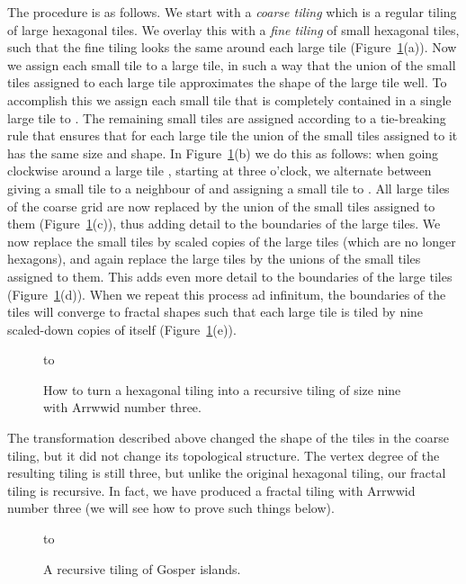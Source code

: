 \documentclass[11pt,a4paper]{article}
\begin{document}
The procedure is as follows. We start with a \emph{coarse tiling} which is a regular tiling of large hexagonal tiles. We overlay this with a \emph{fine tiling} of small hexagonal tiles, such that the fine tiling looks the same around each large tile (Figure~\ref{fig:recursification}(a)). Now we assign each small tile to a large tile, in such a way that the union of the small tiles assigned to each large tile approximates the shape of the large tile well. To accomplish this we assign each small tile that is completely contained in a single large tile  to . The remaining small tiles are assigned according to a tie-breaking rule that ensures that for each large tile the union of the small tiles assigned to it has the same size and shape. In Figure~\ref{fig:recursification}(b) we do this as follows: when going clockwise around a large tile , starting at three o'clock, we alternate between giving a small tile to a neighbour of  and assigning a small tile to . All large tiles of the coarse grid are now replaced by the union of the small tiles assigned to them (Figure~\ref{fig:recursification}(c)), thus adding detail to the boundaries of the large tiles. We now replace the small tiles by scaled copies of the large tiles (which are no longer hexagons), and again replace the large tiles by the unions of the small tiles assigned to them. This adds even more detail to the boundaries of the large tiles (Figure~\ref{fig:recursification}(d)). When we repeat this process ad infinitum, the boundaries of the tiles will converge to fractal shapes such that each large tile is tiled by nine scaled-down copies of itself (Figure~\ref{fig:recursification}(e)).

\begin{figure}
\centering
\hbox to 
\caption{How to turn a hexagonal tiling into a recursive tiling of size nine with Arrwwid number three.}
\label{fig:recursification}
\end{figure}

The transformation described above changed the shape of the tiles in the coarse tiling, but it did not change its topological structure. The vertex degree of the resulting tiling is still three, but unlike the original hexagonal tiling, our fractal tiling is recursive. In fact, we have produced a fractal tiling with Arrwwid number three (we will see how to prove such things below).

\begin{figure}
\centering
\hbox to 
\caption{A recursive tiling of Gosper islands.}
\label{fig:gosper}
\end{figure}
\end{document}
